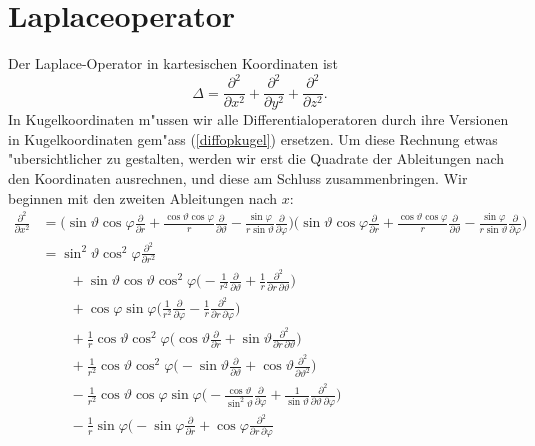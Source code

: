 \section{Laplaceoperator}
Der Laplace-Operator in kartesischen Koordinaten ist
\[
\Delta
=
\frac{\partial^2}{\partial x^2}
+
\frac{\partial^2}{\partial y^2}
+
\frac{\partial^2}{\partial z^2}.
\]
In Kugelkoordinaten m"ussen wir alle Differentialoperatoren durch
ihre Versionen in Kugelkoordinaten gem"ass (\ref{diffopkugel}) 
ersetzen.
Um diese Rechnung etwas "ubersichtlicher zu gestalten, werden wir erst
die Quadrate der Ableitungen nach den Koordinaten ausrechnen, und diese
am Schluss zusammenbringen.
Wir beginnen mit den zweiten Ableitungen nach $x$:
\begin{align*}
\frac{\partial^2}{\partial x^2}
&=
\biggl(
\sin\vartheta\cos\varphi
\frac{\partial}{\partial r}
+
\frac{\cos\vartheta\cos\varphi}{r}
\frac{\partial}{\partial\vartheta}
-
\frac{\sin\varphi}{r\sin\vartheta}
\frac{\partial}{\partial\varphi}
\biggr)
\biggl(
\sin\vartheta\cos\varphi
\frac{\partial}{\partial r}
+
\frac{\cos\vartheta\cos\varphi}{r}
\frac{\partial}{\partial\vartheta}
-
\frac{\sin\varphi}{r\sin\vartheta}
\frac{\partial}{\partial\varphi}
\biggr)
\\
&=
\sin^2\vartheta\cos^2\varphi\frac{\partial^2}{\partial r^2}
\\
&\qquad
+
\sin\vartheta \cos\vartheta \cos^2\varphi
\biggl(
-\frac1{r^2}
\frac{\partial}{\partial\vartheta}
+\frac1{r}
\frac{\partial^2}{\partial r\,\partial\vartheta}
\biggr)
\\
&\qquad
+
\cos\varphi\sin\varphi\biggl(
\frac1{r^2}\frac{\partial}{\partial\varphi}
-\frac1{r}\frac{\partial^2}{\partial r\,\partial\varphi}
\biggr)
\\
&\qquad
+\frac1{r}
\cos\vartheta\cos^2\varphi
\biggl(
\cos\vartheta\frac{\partial}{\partial r}
+
\sin\vartheta \frac{\partial^2}{\partial r\,\partial\vartheta}
\biggr)
\\
&\qquad
+\frac1{r^2}
\cos\vartheta\cos^2\varphi\biggl(
-\sin\vartheta
\frac{\partial}{\partial\vartheta}
+
\cos\vartheta
\frac{\partial^2}{\partial\vartheta^2}
\biggr)
\\
&\qquad
-\frac1{r^2}
\cos\vartheta\cos\varphi\sin\varphi
\biggl(
-\frac{\cos\vartheta}{\sin^2\vartheta}
\frac{\partial}{\partial\varphi}
+\frac1{\sin\vartheta}
\frac{\partial^2}{\partial\vartheta\,\partial\varphi}
\biggr)
\\
&\qquad
-\frac1r\sin\varphi\biggl(
-\sin\varphi \frac{\partial}{\partial r}
+\cos\varphi \frac{\partial^2}{\partial r\,\partial\varphi}

\end{align*}
